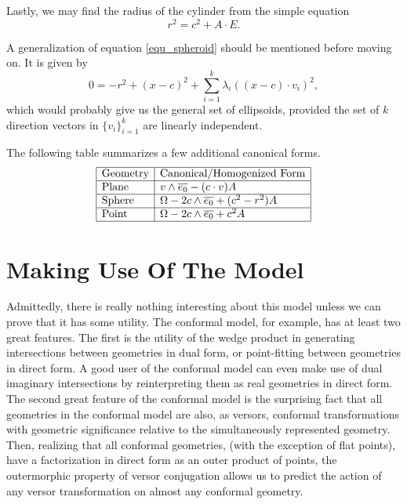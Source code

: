 \documentclass[12pt]{article}
\numberwithin{equation}{section}
\begin{document}
Lastly, we may find the radius of the cylinder from the simple equation
\begin{equation}
r^2 = c^2 + A\cdot E.
\end{equation}

A generalization of equation \eqref{equ_spheroid} should be mentioned
before moving on.  It is given by
\begin{equation}
0 = -r^2 + (x-c)^2 + \sum_{i=1}^k \lambda_i((x-c)\cdot v_i)^2,
\end{equation}
which would probably give us the general set of ellipsoids, provided
the set of $k$ direction vectors in $\{v_i\}_{i=1}^k$ are
linearly independent.

The following table summarizes a few additional canonical forms.
\begin{equation}\label{equ_canonical_forms_table}
\begin{array}{|l|l|}
\hline
\mbox{Geometry} & \mbox{Canonical/Homogenized Form} \\
\hline
\mbox{Plane} & v\wedge\overline{e_0} - (c\cdot v)A \\
\hline
\mbox{Sphere} & \Omega - 2c\wedge\overline{e_0} + (c^2-r^2)A \\
\hline
\mbox{Point} & \Omega - 2c\wedge\overline{e_0} + c^2A \\
\hline
\end{array}
\end{equation}

\section{Making Use Of The Model}

Admittedly, there is really nothing interesting about this model unless we can
prove that it has some utility.  The conformal model, for example, has at least
two great features.  The first is the utility of the wedge product in generating
intersections between geometries in dual form, or point-fitting between
geometries in direct form.  A good user of the conformal model can even
make use of dual imaginary intersections by reinterpreting them as real geometries
in direct form.  The second great feature of the conformal model is the
surprising fact that all geometries in the conformal model are also, as versors, conformal transformations
with geometric significance relative to the simultaneously represented geometry.
Then, realizing that all conformal geometries, (with the exception of flat points), have
a factorization in direct form as an outer product of points, the outermorphic
property of versor conjugation allows us to predict the action of any versor
transformation on almost any conformal geometry.
\end{document}
